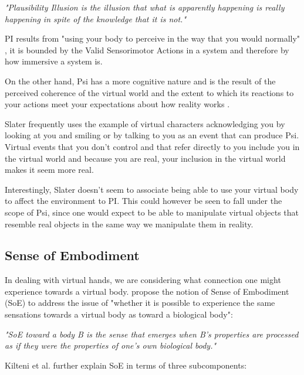 \begin{displayquote}
\textit{"Plausibility Illusion is the illusion that what is apparently happening is really happening in spite of the knowledge that it is not."}
\end{displayquote}

PI results from "using your body to perceive in the way that you would normally" \parencite{Slater2015}, it is bounded by the Valid Sensorimotor Actions in a system and therefore by how immersive a system is.

On the other hand, Psi has a more cognitive nature and is the result of the perceived coherence of the virtual world and the extent to which its reactions to your actions meet your expectations about how reality works \parencite{Slater2015}.

Slater frequently uses the example of virtual characters acknowledging you by looking at you and smiling or by talking to you as an event that can produce Psi. Virtual events that you don't control and that refer directly to you include you in the virtual world and because you are real, your inclusion in the virtual world makes it seem more real.

Interestingly, Slater doesn't seem to associate being able to use your virtual body to affect the environment to PI. This could however be seen to fall under the scope of Psi, since one would expect to be able to manipulate virtual objects that resemble real objects in the same way we manipulate them in reality. 

\subsection{Sense of Embodiment}
\label{subsec:embodiment}

In dealing with virtual hands, we are considering what connection one might experience towards a virtual body. \parencite{Kilteni2012} propose the notion of Sense of Embodiment (SoE) to address the issue of "whether it is possible to experience the same sensations towards a virtual body as toward a biological body":

\begin{displayquote}
\textit{"SoE toward a body B is the sense that emerges when B's properties are processed as if they were the properties of one's own biological body."}
\end{displayquote}

Kilteni et al. further explain SoE in terms of three subcomponents:

